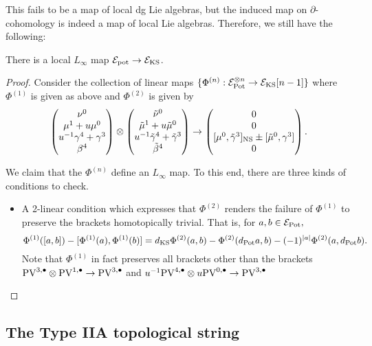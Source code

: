 \documentclass[11pt]{amsart}
\def\PV{{\rm PV}}
\begin{document}
This fails to be a map of local dg Lie algebras, but the induced map on $\partial$-cohomology is indeed a map of local Lie algebras. Therefore, we still have the following:

\begin{prop}
There is a local $L_{\infty}$ map $\mathcal E_{\rm pot}\to \mathcal E_{\rm KS}$.
\end{prop}
\begin{proof}
  Consider the collection of linear maps $\{\Phi^{(n)}: \mathcal E_{\rm Pot}^{\otimes n}\to \mathcal E_{\rm KS}[n-1]\}$ where $\Phi^{(1)}$ is given as above and $\Phi^{{(2)}}$ is given by \[\begin{pmatrix}\nu^{0} \\ \mu^{1}+u\mu^{0} \\ u^{-1}\gamma^{4}+\gamma^{3} \\ \beta^{4}\end{pmatrix}\otimes \begin{pmatrix}\tilde{\nu}^{0} \\ \tilde{\mu}^{1}+u\tilde{\mu}^{0}\\ u^{-1}\tilde{\gamma}^{4}+\tilde{\gamma}^{3} \\ \tilde{\beta}^{4} \end{pmatrix}\to \begin{pmatrix} 0 \\ 0 \\ [\mu^{0},\tilde{\gamma}^{3}]_{\rm NS}\pm [\tilde{\mu}^{0},\gamma^{3}] \\ 0\end{pmatrix}.\]

  We claim that the $\Phi^{(n)}$ define an $L_{\infty}$ map. To this end, there are three kinds of conditions to check.
  \begin{itemize}
    \item A 2-linear condition which expresses that $\Phi^{(2)}$ renders the failure of $\Phi^{(1)}$ to preserve the brackets homotopically trivial. That is, for $a,b\in\mathcal E_{\rm Pot},$ \[\Phi^{(1)}([a,b])-[\Phi^{(1)}(a),\Phi^{(1)}(b)]=d_{\rm KS}\Phi^{(2)}(a,b)-\Phi^{(2)}(d_{\rm Pot}a, b)-(-1)^{|a|}\Phi^{(2)}(a,d_{\rm Pot}b).\] Note that $\Phi^{(1)}$ in fact preserves all brackets other than the brackets $\PV^{3,\bu}\otimes \PV^{1,\bu}\to \PV^{3,\bu}$ and $u^{-1}\PV^{4,\bu}\otimes u\PV^{0,\bu}\to \PV^{3,\bu}$
  \end{itemize}
\end{proof}

\subsection{The Type IIA topological string}
\label{IIAtop}
\end{document}

